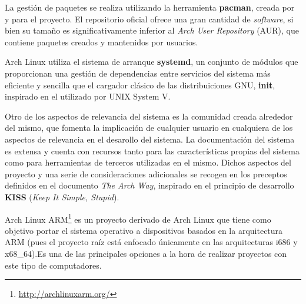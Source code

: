 
La gestión de paquetes se realiza utilizando la herramienta \textbf{pacman}\cite{pacman}, creada por y para el proyecto. El repositorio oficial ofrece una gran cantidad de \textit{software}, si bien su tamaño es significativamente inferior al \textit{Arch User Repository} (AUR), que contiene paquetes creados y mantenidos por usuarios.

Arch Linux utiliza el sistema de arranque \textbf{systemd}\cite{systemd}, un conjunto de módulos que proporcionan una gestión de dependencias entre servicios del sistema más eficiente y sencilla que el cargador clásico de las distribuiciones GNU, \textbf{init}\cite{init}, inspirado en el utilizado por UNIX System V.

Otro de los aspectos de relevancia del sistema es la comunidad creada alrededor del mismo, que fomenta la implicación de cualquier usuario en cualquiera de los aspectos de relevancia en el desarollo del sistema. La documentación del sistema es extensa y cuenta con recursos tanto para las características propias del sistema como para herramientas de terceros utilizadas en el mismo. Dichos aspectos del proyecto y una serie de consideraciones adicionales se recogen en los preceptos definidos en el documento \textit{The Arch Way}\cite{thearchway}, inspirado en el principio de desarrollo \textbf{KISS} (\textit{Keep It Simple, Stupid}).%

Arch Linux ARM\footnote{\href{http://archlinuxarm.org/}{http://archlinuxarm.org/}} es un proyecto derivado de Arch Linux que tiene como objetivo portar el sistema operativo a dispositivos basados en la arquitectura ARM (pues el proyecto raíz está enfocado únicamente en las arquitecturas i686 y x68\_64).Es una de las principales opciones a la hora de realizar proyectos con este tipo de computadores\cite{distrowatch:arm}. %

